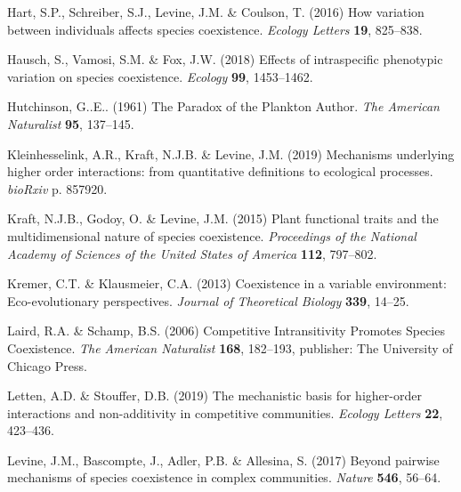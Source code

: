 \documentclass[11pt]{article}
\begin{document}
\begin{thebibliography}{51}
Hart, S.P., Schreiber, S.J., Levine, J.M. \& Coulson, T. (2016) How variation
  between individuals affects species coexistence. \emph{Ecology Letters}
  \textbf{19}, 825--838.

Hausch, S., Vamosi, S.M. \& Fox, J.W. (2018) Effects of intraspecific
  phenotypic variation on species coexistence. \emph{Ecology} \textbf{99},
  1453--1462.

Hutchinson, G..E.. (1961) The {Paradox} of the {Plankton} {Author}. \emph{The
  American Naturalist} \textbf{95}, 137--145.

Kleinhesselink, A.R., Kraft, N.J.B. \& Levine, J.M. (2019) Mechanisms
  underlying higher order interactions: from quantitative definitions to
  ecological processes. \emph{bioRxiv} p. 857920.

Kraft, N.J.B., Godoy, O. \& Levine, J.M. (2015) Plant functional traits and the
  multidimensional nature of species coexistence. \emph{Proceedings of the
  National Academy of Sciences of the United States of America} \textbf{112},
  797--802.

Kremer, C.T. \& Klausmeier, C.A. (2013) Coexistence in a variable environment:
  {Eco}-evolutionary perspectives. \emph{Journal of Theoretical Biology}
  \textbf{339}, 14--25.

Laird, R.A. \& Schamp, B.S. (2006) Competitive {Intransitivity} {Promotes}
  {Species} {Coexistence}. \emph{The American Naturalist} \textbf{168},
  182--193, publisher: The University of Chicago Press.

Letten, A.D. \& Stouffer, D.B. (2019) The mechanistic basis for higher-order
  interactions and non-additivity in competitive communities. \emph{Ecology
  Letters} \textbf{22}, 423--436.

Levine, J.M., Bascompte, J., Adler, P.B. \& Allesina, S. (2017) Beyond pairwise
  mechanisms of species coexistence in complex communities. \emph{Nature}
  \textbf{546}, 56--64.


\end{thebibliography}
\end{document}
